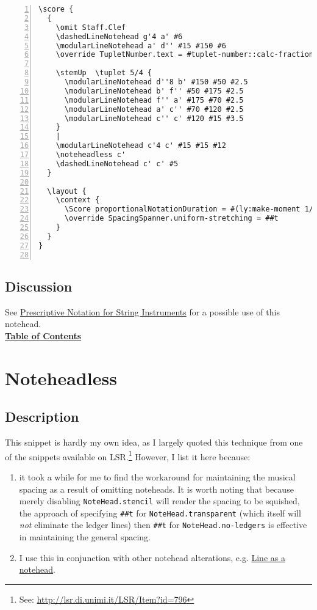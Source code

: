\begin{Verbatim}[numbers=left,xleftmargin=5mm]
\score {
  {
    \omit Staff.Clef
    \dashedLineNotehead g'4 a' #6
    \modularLineNotehead a' d'' #15 #150 #6
    \override TupletNumber.text = #tuplet-number::calc-fraction-text

    \stemUp  \tuplet 5/4 {
      \modularLineNotehead d''8 b' #150 #50 #2.5
      \modularLineNotehead b' f'' #50 #175 #2.5
      \modularLineNotehead f'' a' #175 #70 #2.5
      \modularLineNotehead a' c'' #70 #120 #2.5
      \modularLineNotehead c'' c' #120 #15 #3.5
    }
    |
    \modularLineNotehead c'4 c' #15 #15 #12
    \noteheadless c'
    \dashedLineNotehead c' c' #5
  }

  \layout {
    \context {
      \Score proportionalNotationDuration = #(ly:make-moment 1/10)    
      \override SpacingSpanner.uniform-stretching = ##t
    }
  }
}


\end{Verbatim}
\subsection{Discussion}

See \hyperref[sec:comb_strings]{Prescriptive Notation for String Instruments} for a possible use of this notehead. \\ 
\break
\hyperref[sec:toc]{\textbf{Table of Contents}}

\vfill \break




\section {Noteheadless}
\hfill

\subsection{Description}
This snippet is hardly my own idea, as I largely quoted this technique from one of the snippets available on LSR.\footnote{See: \url{http://lsr.di.unimi.it/LSR/Item?id=796}} However, I list it here because: 
\begin{enumerate} 
\item it took a while for me to find the workaround for maintaining the musical spacing as a result of omitting noteheads. It is worth noting that because merely disabling \verb|NoteHead.stencil| will render the spacing to be squished, the approach of specifying \verb|##t| for \verb|NoteHead.transparent| (which itself will \textit{not} eliminate the ledger lines) then \verb|##t| for \verb|NoteHead.no-ledgers| is effective in maintaining the general spacing.
\item I use this in conjunction with other notehead alterations, e.g. \hyperref[sec:line_notehead]{Line as a notehead}. 
\end{enumerate}

